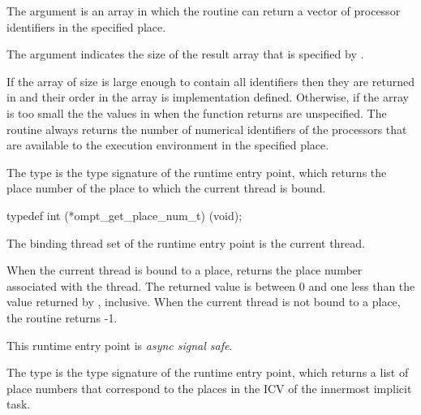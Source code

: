 The  argument is an array in which the routine can return
a vector of processor identifiers in the specified place.

The  argument indicates the size of the result array that
is specified by .

\effect
If the  array of size  is large enough to contain 
all identifiers then they are returned in  and their order in the 
array is implementation defined. Otherwise, if the  array is too 
small the the values in  when the function returns are unspecified.
The routine always returns the number of numerical identifiers of the 
processors that are available to the execution environment in the specified place.



\label{sec:ompt_get_place_num_t}
\label{sec:ompt_get_place_num}

\summary
The  type is the type signature of the 
 runtime entry point, which returns the
place number of the place to which the current thread is bound.

\format
\begin{ccppspecific}
\begin{omptInquiry}
typedef int (*ompt_get_place_num_t) (void);
\end{omptInquiry}
\end{ccppspecific}

\binding
The binding thread set of the  runtime entry point
is the current thread.

\descr
When the current thread is bound to a place, 
returns the place number associated with the thread. The returned value 
is between 0 and one less than the value returned by , 
inclusive. When the current thread is not bound to a place, the routine returns -1.

This runtime entry point is \emph{async signal safe}.



\label{sec:ompt_get_partition_place_nums_t}
\label{sec:ompt_get_partition_place_nums}

\summary
The  type is the type signature 
of the  runtime entry point, which 
returns a list of place numbers that correspond to the places in the 
 ICV of the innermost implicit task.

